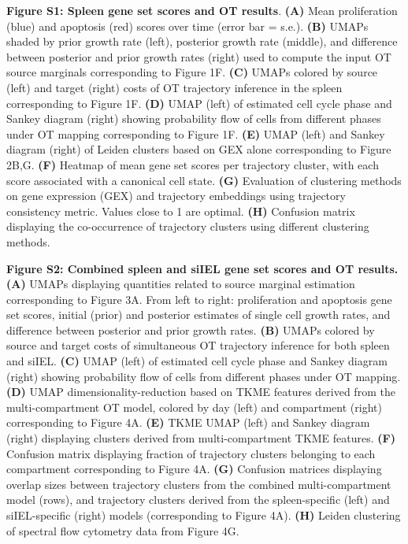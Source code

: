 \textbf{Figure S1: Spleen gene set scores and OT results}. \textbf{(A)}
Mean proliferation (blue) and apoptosis (red) scores over time (error
bar = s.e.). \textbf{(B)} UMAPs shaded by prior growth rate (left),
posterior growth rate (middle), and difference between posterior and
prior growth rates (right) used to compute the input OT source marginals
corresponding to Figure 1F. \textbf{(C)} UMAPs colored by source (left)
and target (right) costs of OT trajectory inference in the spleen
corresponding to Figure 1F. \textbf{(D)} UMAP (left) of estimated cell
cycle phase and Sankey diagram (right) showing probability flow of cells
from different phases under OT mapping corresponding to Figure 1F.
\textbf{(E)} UMAP (left) and Sankey diagram (right) of Leiden clusters
based on GEX alone corresponding to Figure 2B,G. \textbf{(F)} Heatmap of
mean gene set scores per trajectory cluster, with each score associated
with a canonical cell state. \textbf{(G)} Evaluation of clustering
methods on gene expression (GEX) and trajectory embeddings using
trajectory consistency metric. Values close to 1 are optimal.
\textbf{(H)} Confusion matrix displaying the co-occurrence of trajectory
clusters using different clustering methods.

\textbf{Figure S2: Combined spleen and siIEL gene set scores and OT
results.} \textbf{(A)} UMAPs displaying quantities related to source
marginal estimation corresponding to Figure 3A. From left to right:
proliferation and apoptosis gene set scores, initial (prior) and
posterior estimates of single cell growth rates, and difference between
posterior and prior growth rates. \textbf{(B)} UMAPs colored by source
and target costs of simultaneous OT trajectory inference for both spleen
and siIEL. \textbf{(C)} UMAP (left) of estimated cell cycle phase and
Sankey diagram (right) showing probability flow of cells from different
phases under OT mapping. \textbf{(D)} UMAP dimensionality-reduction
based on TKME features derived from the multi-compartment OT model,
colored by day (left) and compartment (right) corresponding to Figure
4A. \textbf{(E)} TKME UMAP (left) and Sankey diagram (right) displaying
clusters derived from multi-compartment TKME features. \textbf{(F)}
Confusion matrix displaying fraction of trajectory clusters belonging to
each compartment corresponding to Figure 4A. \textbf{(G)} Confusion
matrices displaying overlap sizes between trajectory clusters from the
combined multi-compartment model (rows), and trajectory clusters derived
from the spleen-specific (left) and siIEL-specific (right) models
(corresponding to Figure 4A). \textbf{(H)} Leiden clustering of spectral
flow cytometry data from Figure 4G.

